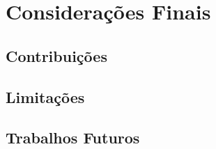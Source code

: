 \chapter{Considerações Finais}
\label{cap:consideracoes}

\section{Contribuições}

\section{Limitações}

\section{Trabalhos Futuros}
